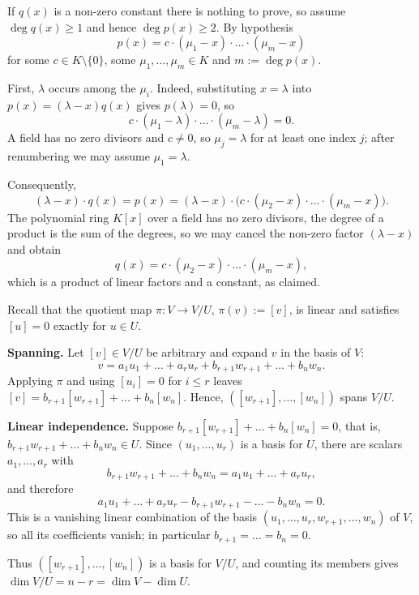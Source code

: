 \begin{exercisesolution}
\label{sol:factor_splits}
  If $q(x)$ is a non-zero constant there is nothing to prove, so assume $\deg q(x) \ge 1$ and hence $\deg p(x) \ge 2$. By hypothesis
  \[ p(x) = c \cdot (\mu_1 - x) \cdot \dots \cdot (\mu_m - x) \]
  for some $c \in K \setminus \{0\}$, some $\mu_1, \dots, \mu_m \in K$ and $m := \deg p(x)$.

  First, $\lambda$ occurs among the $\mu_i$. Indeed, substituting $x = \lambda$ into $p(x) = (\lambda - x) q(x)$ gives $p(\lambda) = 0$, so
  \[ c \cdot (\mu_1 - \lambda) \cdot \dots \cdot (\mu_m - \lambda) = 0. \]
  A field has no zero divisors and $c \ne 0$, so $\mu_j = \lambda$ for at least one index $j$; after renumbering we may assume $\mu_1 = \lambda$.

  Consequently,
  \[ (\lambda - x) \cdot q(x) = p(x) = (\lambda - x) \cdot \big( c \cdot (\mu_2 - x) \cdot \dots \cdot (\mu_m - x) \big). \]
  The polynomial ring $K[x]$ over a field has no zero divisors, the degree of a product is the sum of the degrees, so we may cancel the non-zero factor $(\lambda - x)$ and obtain
  \[ q(x) = c \cdot (\mu_2 - x) \cdot \dots \cdot (\mu_m - x), \]
  which is a product of linear factors and a constant, as claimed.
\end{exercisesolution}

\begin{exercisesolution}
\label{sol:quotient_basis}
  Recall that the quotient map $\pi : V \to V/U$, $\pi(v) := [v]$, is linear and satisfies $[u] = 0$ exactly for $u \in U$.

  \textbf{Spanning.} Let $[v] \in V/U$ be arbitrary and expand $v$ in the basis of $V$:
  \[ v = a_1 u_1 + \dots + a_r u_r + b_{r+1} w_{r+1} + \dots + b_n w_n. \]
  Applying $\pi$ and using $[u_i] = 0$ for $i \le r$ leaves $[v] = b_{r+1}[w_{r+1}] + \dots + b_n[w_n]$. Hence, $([w_{r+1}], \dots, [w_n])$ spans $V/U$.

  \textbf{Linear independence.} Suppose $b_{r+1}[w_{r+1}] + \dots + b_n[w_n] = 0$, that is, $b_{r+1} w_{r+1} + \dots + b_n w_n \in U$. Since $(u_1, \dots, u_r)$ is a basis for $U$, there are scalars $a_1, \dots, a_r$ with
  \[ b_{r+1} w_{r+1} + \dots + b_n w_n = a_1 u_1 + \dots + a_r u_r, \]
  and therefore
  \[ a_1 u_1 + \dots + a_r u_r - b_{r+1} w_{r+1} - \dots - b_n w_n = 0. \]
  This is a vanishing linear combination of the basis $(u_1, \dots, u_r, w_{r+1}, \dots, w_n)$ of $V$, so all its coefficients vanish; in particular $b_{r+1} = \dots = b_n = 0$.

  Thus $([w_{r+1}], \dots, [w_n])$ is a basis for $V/U$, and counting its members gives $\dim V/U = n - r = \dim V - \dim U$.
\end{exercisesolution}

